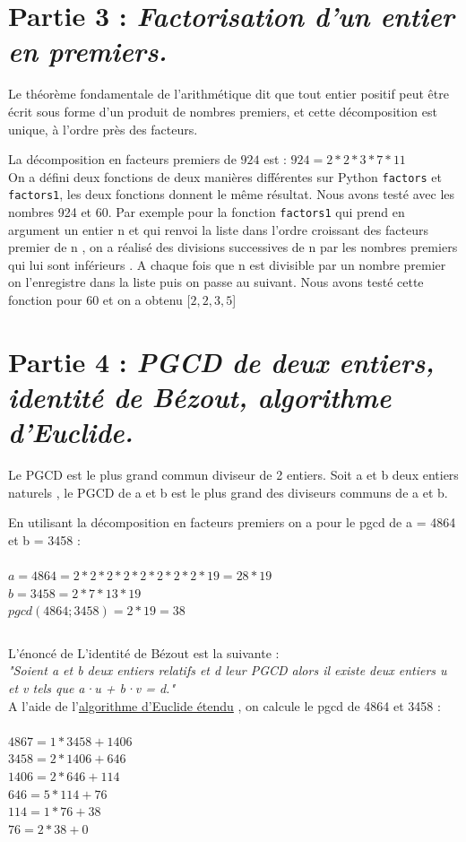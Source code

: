\documentclass{article}
\begin{document}
\section{{\color{red}Partie 3 :} \textit{Factorisation d'un entier en premiers.}}

Le théorème fondamentale de l'arithmétique dit que tout entier positif peut être écrit sous forme d'un produit de nombres premiers, et cette décomposition est unique, à l'ordre près des facteurs.

La décomposition en facteurs premiers de $924$ est : $924 = 2*2*3*7*11$\\

On a défini deux fonctions de deux manières différentes sur Python \texttt{factors} et \texttt{factors1}, les deux fonctions donnent le même résultat. Nous avons testé avec les nombres 924 et 60. Par exemple pour la fonction \texttt{factors1} qui prend en argument un entier n et qui renvoi la liste dans l’ordre croissant des facteurs premier de n , on a réalisé des divisions successives de n par les nombres premiers qui lui sont inférieurs .
A chaque fois que n est divisible par un nombre premier on l’enregistre dans la liste puis on passe au suivant. Nous avons testé cette fonction pour $60$ et on a obtenu [$2,2,3,5$]

\section{{\color{red}Partie 4 :} \textit{PGCD de deux entiers, identité de Bézout, algorithme d’Euclide.}}

Le PGCD est le plus grand commun diviseur de 2 entiers. Soit a et b deux entiers naturels , le PGCD de a et b est le plus grand des diviseurs communs de a et b.

En utilisant la décomposition en facteurs premiers on a pour le pgcd de a = 4864 et b = 3458 :\\
\\
$a = 4864 = 2*2*2*2*2*2*2*2*19 = 28*19$
\\
$b = 3458 = 2*7*13*19$
\\
$pgcd(4864 ; 3458) = 2*19 = 38$

$$ $$

L'énoncé de L'identité de Bézout est la suivante : \\
\textit{"Soient a et b deux entiers relatifs et d leur PGCD alors il existe deux entiers u et v tels que a·u + b·v = d."}
\\
A l'aide de l'\href{https://en.wikipedia.org/wiki/Extended_Euclidean_algorithm}{algorithme d'Euclide étendu} , on calcule le pgcd de 4864 et 3458 :\\
\\
$4867 = 1 * 3458 + 1406$\\
$3458 = 2 * 1406 + 646$\\
$1406 = 2 * 646  + 114$\\
$646  = 5 * 114  + 76$\\
$114  = 1 * 76   + 38$\\
$76   = 2 * 38   + 0$\\
\end{document}
